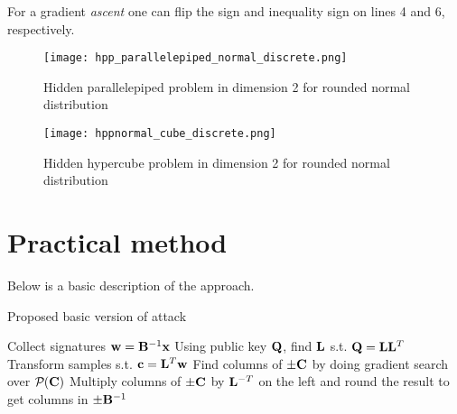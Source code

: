 {{For a gradient \textit{ascent} one can flip the sign and inequality sign on lines 4 and 6, respectively.

\begin{figure}[H]
    \centering
    \texttt{[image: hpp\_parallelepiped\_normal\_discrete.png]}
    \caption{Hidden parallelepiped problem in dimension 2 for rounded normal distribution}
  	\medskip 
    \label{parallelepiped_normal_discrete}
\end{figure}

\begin{figure}[H]
    \centering
    \texttt{[image: hppnormal\_cube\_discrete.png]}
    \caption{Hidden hypercube problem in dimension 2 for rounded normal distribution}
  	\medskip 
    \label{hypercube_normal_discrete}
\end{figure}
\section{Practical method}

Below is a basic description of the approach.
\begin{algorithm}[H]
\caption{Proposed basic version of attack}
\begin{algorithmic}[1]
    \State Collect signatures $\mathbf{w} = \mathbf{B}^{-1} \mathbf{x}$
    \State Using public key $\mathbf{Q}$, find $\mathbf{L}$ s.t. $\mathbf{Q} = \mathbf{L} \mathbf{L}^T$
    \State Transform samples s.t. $\mathbf{c} = \mathbf{L}^T \mathbf{w}$
    \State Find columns of $\pm \mathbf{C}$ by doing gradient search over $\mathcal{P}_{}(\mathbf{C})$
    \State Multiply columns of $\pm \mathbf{C}$ by $\mathbf{L}^{-T}$ on the left and round the result to get columns in $\pm \mathbf{B}^{-1}$
\end{algorithmic}
\end{algorithm}

}}
